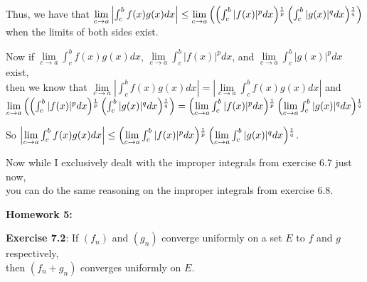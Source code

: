 \documentclass{book}
\newenvironment{myIndent}{%
   \begin{adjustwidth}{2.5em}{0em}%
}{%
   \end{adjustwidth}%
}
\newcommand*{\markHW}[1]{%
   {\huge \color{Black} \textbf{#1} \newline}%
}
\newcommand{\retTwo}{\hfill\bigbreak}
\begin{document}
\begin{itemize}
{\begin{myIndent}
      Thus, we have that $\lim\limits_{c\rightarrow a}\left|\int_c^b f(x)g(x)dx\right| \leq \lim\limits_{c\rightarrow a}\left(\left(\int_c^b|f(x)|^p dx\right)\hspace{-0.2em}\vphantom{b}^{\frac{1}{p}}\left(\int_c^b|g(x)|^q dx\right)\hspace{-0.2em}\vphantom{b}^{\frac{1}{q}}\right)$\\ when the limits of both sides exist.\retTwo

      Now if $\lim\limits_{c\rightarrow a}\int_c^b f(x)g(x)dx$,   $\lim\limits_{c\rightarrow a}\int_c^b|f(x)|^p dx$, and $\lim\limits_{c\rightarrow a}\int_c^b|g(x)|^p dx$ exist,\\ then we know that $\lim\limits_{c\rightarrow a}\left|\int_c^b f(x)g(x)dx\right| = \left|\lim\limits_{c\rightarrow a}\int_c^b f(x)g(x)dx\right|$ and\\ 
      {\fontsize{12}{14}$\lim\limits_{c\rightarrow a}\left(\left(\int_c^b|f(x)|^p dx\right)\hspace{-0.2em}\vphantom{b}^{\frac{1}{p}}\left(\int_c^b|g(x)|^q dx\right)\hspace{-0.2em}\vphantom{b}^{\frac{1}{q}}\right) = \left(\lim\limits_{c\rightarrow a}\int_c^b|f(x)|^p dx\right)\hspace{-0.2em}\vphantom{b}^{\frac{1}{p}}\left(\lim\limits_{c\rightarrow a}\int_c^b|g(x)|^q dx\right)\hspace{-0.2em}\vphantom{b}^{\frac{1}{q}}$}\retTwo

      So $\left|\lim\limits_{c\rightarrow a}\int_c^b f(x)g(x)dx\right| \leq \left(\lim\limits_{c\rightarrow a}\int_c^b|f(x)|^p dx\right)\hspace{-0.2em}\vphantom{b}^{\frac{1}{p}}\left(\lim\limits_{c\rightarrow a}\int_c^b|g(x)|^q dx\right)\hspace{-0.2em}\vphantom{b}^{\frac{1}{q}}$.\retTwo

      Now while I exclusively dealt with the improper integrals from exercise 6.7 just now,\\ you can do the same reasoning on the improper integrals from exercise 6.8.

   \end{myIndent}}
\end{itemize}

\newpage

\markHW{Homework 5:}

\textbf{Exercise 7.2}: If $(f_n)$ and $(g_n)$ converge uniformly on a set $E$ to $f$ and $g$ respectively,\\ then $(f_n + g_n)$ converges uniformly on $E$.\\ [-9pt]
\end{document}

